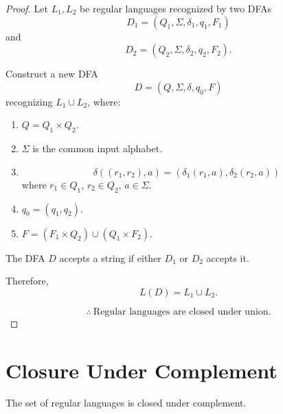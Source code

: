 \documentclass[11pt]{scrreprt}
\begin{document}
\begin{proof}
    Let $L_1, L_2$ be regular languages recognized by two DFAs
    \[
        D_1 = (Q_1, \Sigma, \delta_1, q_1, F_1)
    \]
    and
    \[
        D_2 = (Q_2, \Sigma, \delta_2, q_2, F_2).
    \]

    Construct a new DFA
    \[
        D = (Q, \Sigma, \delta, q_0, F)
    \]
    recognizing $L_1 \cup L_2$, where:

    \begin{enumerate}
        \item $Q = Q_1 \times Q_2$.

        \item $\Sigma$ is the common input alphabet.

        \item
        \[
            \delta((r_1,r_2),a)
            =
            (\delta_1(r_1,a),\delta_2(r_2,a))
        \]
        where $r_1 \in Q_1$, $r_2 \in Q_2$,
        $a \in \Sigma$.

        \item $q_0 = (q_1,q_2)$.

        \item $F = (F_1 \times Q_2) \cup (Q_1 \times F_2)$.
    \end{enumerate}

    The DFA $D$ accepts a string if either $D_1$ or $D_2$
    accepts it.

    Therefore,
    \[
        L(D) = L_1 \cup L_2.
    \]

    \[
        \boxed{
            \therefore\ \text{Regular languages are closed under union.}
        }
    \]
\end{proof}

\section{Closure Under Complement}
\begin{theorem*}
    The set of regular languages is closed under complement.
\end{theorem*}
\end{document}
